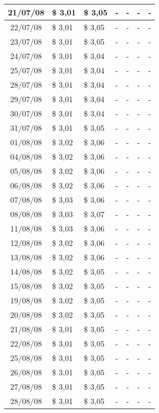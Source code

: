 \begin{center}
\begin{longtable}{|c|p{1.5cm}|p{1.5cm}|p{1.5cm}|p{1.5cm}|p{1.5cm}|p{1.5cm}|}
21/07/08 & \$ 3,01 & \$ 3,05 & - & - & - & - \\ \hline
22/07/08 & \$ 3,01 & \$ 3,05 & - & - & - & - \\ \hline
23/07/08 & \$ 3,01 & \$ 3,05 & - & - & - & - \\ \hline
24/07/08 & \$ 3,01 & \$ 3,04 & - & - & - & - \\ \hline
25/07/08 & \$ 3,01 & \$ 3,04 & - & - & - & - \\ \hline
28/07/08 & \$ 3,01 & \$ 3,04 & - & - & - & - \\ \hline
29/07/08 & \$ 3,01 & \$ 3,04 & - & - & - & - \\ \hline
30/07/08 & \$ 3,01 & \$ 3,04 & - & - & - & - \\ \hline
31/07/08 & \$ 3,01 & \$ 3,05 & - & - & - & - \\ \hline
01/08/08 & \$ 3,02 & \$ 3,06 & - & - & - & - \\ \hline
04/08/08 & \$ 3,02 & \$ 3,06 & - & - & - & - \\ \hline
05/08/08 & \$ 3,02 & \$ 3,06 & - & - & - & - \\ \hline
06/08/08 & \$ 3,02 & \$ 3,06 & - & - & - & - \\ \hline
07/08/08 & \$ 3,03 & \$ 3,06 & - & - & - & - \\ \hline
08/08/08 & \$ 3,03 & \$ 3,07 & - & - & - & - \\ \hline
11/08/08 & \$ 3,03 & \$ 3,06 & - & - & - & - \\ \hline
12/08/08 & \$ 3,02 & \$ 3,06 & - & - & - & - \\ \hline
13/08/08 & \$ 3,02 & \$ 3,06 & - & - & - & - \\ \hline
14/08/08 & \$ 3,02 & \$ 3,05 & - & - & - & - \\ \hline
15/08/08 & \$ 3,02 & \$ 3,05 & - & - & - & - \\ \hline
19/08/08 & \$ 3,02 & \$ 3,05 & - & - & - & - \\ \hline
20/08/08 & \$ 3,02 & \$ 3,05 & - & - & - & - \\ \hline
21/08/08 & \$ 3,01 & \$ 3,05 & - & - & - & - \\ \hline
22/08/08 & \$ 3,01 & \$ 3,05 & - & - & - & - \\ \hline
25/08/08 & \$ 3,01 & \$ 3,05 & - & - & - & - \\ \hline
26/08/08 & \$ 3,01 & \$ 3,05 & - & - & - & - \\ \hline
27/08/08 & \$ 3,01 & \$ 3,05 & - & - & - & - \\ \hline
28/08/08 & \$ 3,01 & \$ 3,05 & - & - & - & - \\ \hline

\end{longtable}
\end{center}
